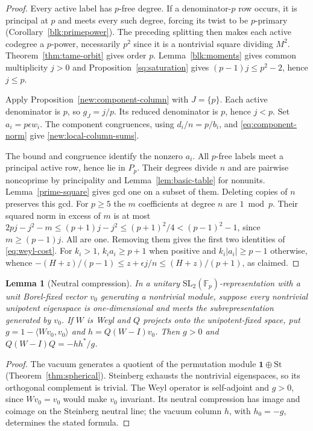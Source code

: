 \documentclass[11pt]{amsart}
\numberwithin{equation}{section}
\newtheorem{lemma}[theorem]{Lemma}
\theoremstyle{definition}
\theoremstyle{plain}
\begin{document}
\begin{proof}
Every active label has $p$-free degree. If a denominator-$p$ row occurs,
it is principal at $p$ and meets every such degree, forcing its twist
to be $p$-primary (Corollary~\ref{blk:primepower}). The preceding
splitting then makes each active codegree a $p$-power, necessarily
$p^2$ since it is a nontrivial square dividing $M^2$. Theorem~\ref{thm:tame-orbit}
gives order $p$. Lemma~\ref{blk:moments} gives common multiplicity $j>0$
and Proposition~\ref{sq:saturation} gives $(p-1)j\le p^2-2$, hence $j\le p$.

Apply Proposition~\ref{new:component-column} with $J=\{p\}$. Each
active denominator is $p$, so $g_J=j/p$. Its reduced denominator is $p$,
hence $j<p$. Set $a_i=p\epsilon w_i$. The component congruences,
using $d_i/n=p/b_i$, and \eqref{eq:component-norm} give
\eqref{new:local-column-sums}.

The bound and congruence identify the nonzero $a_i$. All $p$-free labels
meet a principal active row, hence lie in $P_p$. Their degrees divide $n$
and are pairwise noncoprime by principality and Lemma~\ref{lem:basic-table}
for nonunits. Lemma~\ref{prime-square} gives gcd one on a subset of
them. Deleting copies of $n$ preserves this gcd. For $p\ge5$ the $m$
coefficients at degree $n$ are $1\bmod p$. Their squared norm in
excess of $m$ is at most
$2pj-j^2-m\le(p+1)j-j^2\le(p+1)^2/4<(p-1)^2-1$, since $m\ge(p-1)j$.
All are one. Removing them gives the first two identities of
\eqref{eq:weyl-cost}. For $k_i>1$, $k_i a_i\ge p+1$ when positive
and $k_i|a_i|\ge p-1$ otherwise, whence
$-(H+z)/(p-1)\le z+\epsilon j/n\le(H+z)/(p+1)$, as claimed.
\end{proof}

\begin{lemma}[Neutral compression]\label{r8:steinberg-compression}
In a unitary $\mathrm{SL}_2(\mathbb F_p)$-representation with a unit
Borel-fixed vector $v_0$ generating a nontrivial module, suppose every nontrivial unipotent
eigenspace is one-dimensional and meets the subrepresentation
generated by $v_0$. If $W$ is Weyl and $Q$ projects onto the
unipotent-fixed space, put $g=1-\langle Wv_0,v_0\rangle$ and
$h=Q(W-I)v_0$. Then $g>0$ and $Q(W-I)Q=-hh^*/g$.
\end{lemma}
\begin{proof}
The vacuum generates a quotient of the permutation module
$\mathbf1\oplus\mathrm{St}$ (Theorem~\ref{thm:spherical}).
Steinberg exhausts the nontrivial eigenspaces, so its orthogonal
complement is trivial. The Weyl operator is self-adjoint and
$g>0$, since $Wv_0=v_0$ would make $v_0$ invariant. Its neutral
compression has image and coimage on the Steinberg neutral line;
the vacuum column $h$, with $h_0=-g$, determines the stated formula.
\end{proof}
\end{document}
